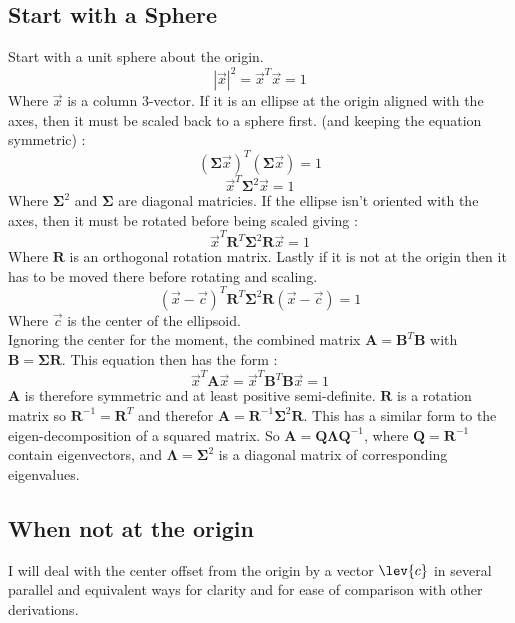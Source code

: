 \documentclass{article}
\def\mat#1{\mathbf{#1}}
\begin{document}
\subsection{Start with a Sphere}
Start with a unit sphere about the origin. 
\begin{equation}
\left| \vec{x} \right |^2 = \vec{x}^T \vec{x} = 1
\end{equation}
Where $\vec{x}$ is a column 3-vector. If it is an ellipse at the origin aligned with the axes, then it must be scaled back to a sphere first. (and keeping the equation symmetric) :
\begin{equation}
(\mat{\Sigma}\vec{x})^T (\mat{\Sigma}\vec{x}) = 1
\end{equation}
\begin{equation}
\vec{x}^T \mat{\Sigma}^2 \vec{x} = 1
\end{equation}
Where $\mat{\Sigma}^2$ and $\mat{\Sigma}$ are diagonal matricies.  If the ellipse isn't oriented with the axes, then it must be rotated before being scaled giving :
\begin{equation}
\vec{x}^T \mat{R}^T \mat{\Sigma}^2 \mat{R} \vec{x} = 1
\end{equation}
Where $\mat{R}$ is an orthogonal rotation matrix.  Lastly if it is not at the origin then it has to be moved there before rotating and scaling.
\begin{equation}
(\vec{x}-\vec{c})^T \mat{R}^T \mat{\Sigma}^2 \mat{R} (\vec{x}-\vec{c}) = 1
\end{equation}
Where $\vec{c}$ is the center of the ellipsoid.\\
Ignoring the center for the moment, the combined matrix $\mat{A} = \mat{B}^T\mat{B}$ with $\mat{B} = \mat{\Sigma} \mat{R}$. This equation then has the form :
\begin{equation}
\vec{x}^T \mat{A} \vec{x} = \vec{x}^T \mat{B}^T \mat{B} \vec{x} = 1
\end{equation}
$\mat{A}$ is therefore symmetric and at least positive semi-definite. $\mat{R}$ is a rotation matrix so $\mat{R}^{-1} = \mat{R}^T$ and therefor
$\mat{A} = \mat{R}^{-1}\mat{\Sigma}^2\mat{R}$. This has a similar form
to the eigen-decomposition of a squared matrix. So $\mat{A} = \mat{Q}\mat{\Lambda}\mat{Q}^{-1}$,
where $\mat{Q} = \mat{R}^{-1}$ contain eigenvectors, and $\mat{\Lambda} = \mat{\Sigma}^2$ is a
diagonal matrix of corresponding eigenvalues.
\subsection{When not at the origin}
I will deal with the center offset from the origin by a vector
$\lev{c}$ in several parallel and equivalent ways for clarity and
for ease of comparison with other derivations.
%
\end{document}
